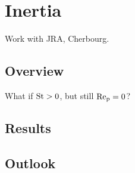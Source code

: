 \documentclass[thesis.tex]{subfiles}
\begin{document}
\chapter{Inertia}

Work with JRA, Cherbourg.

\section{Overview}
 What if $\mbox{St}>0$, but still $\mbox{Re}_{\mathrm p}=0$?

\section{Results}

\section{Outlook}
\end{document}
